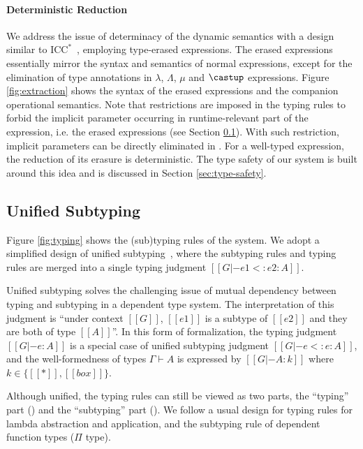 \paragraph{Deterministic Reduction}
We address the issue of determinacy of the dynamic semantics with
a design similar to $\mathrm{ICC}^*$~\cite{barras2008implicit},
employing type-erased expressions. The erased expressions
essentially mirror the syntax and semantics
of normal expressions, except for the elimination of type annotations in $\lambda$,
$\Lambda$, $\mu$ and $\castup$ expressions.
Figure \ref{fig:extraction} shows the syntax of the erased expressions and
the companion operational semantics. Note that restrictions are imposed in the
typing rules to forbid the implicit parameter occurring in runtime-relevant part
of the expression, i.e. the erased expressions (see Section \ref{sec:type-system}).
With such restriction, implicit parameters can be directly eliminated in
. For a well-typed expression, the reduction of
its erasure is deterministic. The type safety of our system is built around
this idea and is discussed in Section \ref{sec:type-safety}.



\subsection{Unified Subtyping}
\label{sec:type-system}

Figure \ref{fig:typing} shows the (sub)typing rules of the system. We adopt a
simplified design of unified subtyping~\cite{full}, where the subtyping rules and
typing rules are merged into a single typing judgment $[[G |- e1 <: e2 : A]]$.

Unified subtyping solves the challenging issue of mutual dependency between typing
and subtyping in a dependent type system.
The interpretation of this judgment is ``under context $[[G]]$, $[[e1]]$ is a
subtype of $[[e2]]$ and they are both of type $[[A]]$''.
In this form of formalization, the typing judgment $[[G |- e : A]]$ is a
special case of unified subtyping judgment $[[G |- e <: e : A]]$,
and the well-formedness of types $\Gamma \vdash A$ is expressed by
$[[G |- A : k]]$ where $k \in \{[[*]], [[box]]\}$.

Although unified, the typing rules can still be viewed as two parts, the ``typing'' part
() and the ``subtyping'' part
(). We follow a usual design for
typing rules for lambda abstraction and application, and the subtyping rule of
dependent function types ($\Pi$ type).

